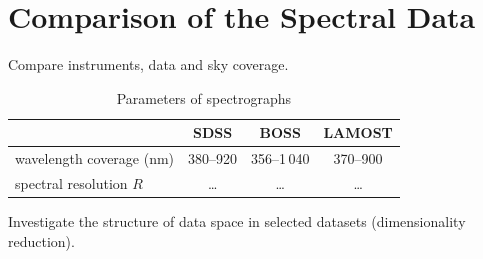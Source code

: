 \section{Comparison of the Spectral Data}

Compare instruments, data and sky coverage.

\begin{table}
	\begin{center}
		\begin{tabular}{|l|c|c|c|}
			\hline
			& SDSS & BOSS & LAMOST \\ \hline \hline
			wavelength coverage (nm) & 380--920 & 356--1\,040 & 370--900 \\ \hline
			spectral resolution \(R\) & \dots & \dots & \dots \\ \hline
		\end{tabular}
	\end{center}
	\caption{Parameters of spectrographs}
\end{table}

Investigate the structure of data space in selected datasets (dimensionality reduction).
